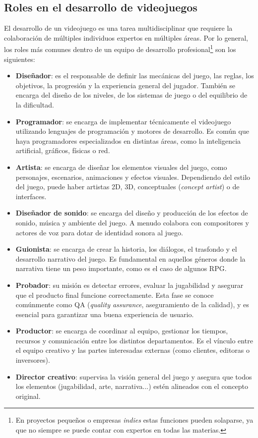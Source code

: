 \subsection{Roles en el desarrollo de videojuegos}
El desarrollo de un videojuego es una tarea multidisciplinar que requiere la colaboración de múltiples individuos expertos en múltiples áreas. Por lo general, los roles más comunes dentro de un equipo de desarrollo profesional\footnote{En proyectos pequeños o empresas \textit{indies} estas funciones pueden solaparse, ya que no siempre se puede contar con expertos en todas las materias.} son los siguientes:
\begin{itemize}
	\item \textbf{Diseñador}: es el responsable de definir las mecánicas del juego, las reglas, los objetivos, la progresión y la experiencia general del jugador. También se encarga del diseño de los niveles, de los sistemas de juego o del equilibrio de la dificultad.
	\item \textbf{Programador}: se encarga de implementar técnicamente el videojuego utilizando lenguajes de programación y motores de desarrollo. Es común que haya programadores especializados en distintas áreas, como la inteligencia artificial, gráficos, físicas o red.
	\item \textbf{Artista}: se encarga de diseñar los elementos visuales del juego, como personajes, escenarios, animaciones y efectos visuales. Dependiendo del estilo del juego, puede haber artistas 2D, 3D, conceptuales ({\textit{concept artist}}) o de interfaces.
	\item \textbf{Diseñador de sonido}: se encarga del diseño y producción de los efectos de sonido, música y ambiente del juego. A menudo colabora con compositores y actores de voz para dotar de identidad sonora al juego.
	\item \textbf{Guionista}: se encarga de crear la historia, los diálogos, el trasfondo y el desarrollo narrativo del juego. Es fundamental en aquellos géneros donde la narrativa tiene un peso importante, como es el caso de algunos RPG.
	\item \textbf{Probador}: su misión es detectar errores, evaluar la jugabilidad y asegurar que el producto final funcione correctamente. Esta fase se conoce comúnmente como QA (\textit{quality assurance}, aseguramiento de la calidad), y es esencial para garantizar una buena experiencia de usuario.
	\item \textbf{Productor}: se encarga de coordinar al equipo, gestionar los tiempos, recursos y comunicación entre los distintos departamentos. Es el vínculo entre el equipo creativo y las partes interesadas externas (como clientes, editoras o inversores).
	\item \textbf{Director creativo}: supervisa la visión general del juego y asegura que todos los elementos (jugabilidad, arte, narrativa...) estén alineados con el concepto original.
\end{itemize}

